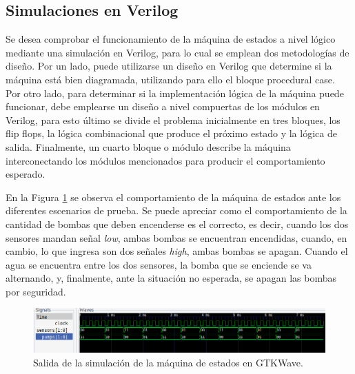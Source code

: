 \subsection{Simulaciones en Verilog}
Se desea comprobar el funcionamiento de la máquina de estados a nivel l\'ogico mediante una simulaci\'on en Verilog, para lo cual se emplean
dos metodolog\'ias de dise\~no.
Por un lado, puede utilizarse un dise\~no en Verilog que determine si la m\'aquina est\'a bien diagramada, utilizando para ello el bloque procedural case.
Por otro lado, para determinar si la implementaci\'on l\'ogica de la m\'aquina puede funcionar, debe emplearse un dise\~no a nivel compuertas de los m\'odulos en Verilog,
para esto \'ultimo se divide el problema inicialmente en tres bloques, los flip flops, la l\'ogica combinacional que produce el pr\'oximo estado y la l\'ogica de salida.
Finalmente, un cuarto bloque o m\'odulo describe la m\'aquina interconectando los m\'odulos mencionados para producir el comportamiento esperado.

En la Figura \ref{fig:gtkwave_sim_ex5} se observa el comportamiento de la máquina de estados ante los diferentes escenarios de prueba.
Se puede apreciar como el comportamiento de la cantidad de bombas que deben encenderse es el correcto, es decir, cuando los dos sensores mandan señal \textit{low}, ambas 
bombas se encuentran encendidas, cuando, en cambio, lo que ingresa son dos señales \textit{high}, ambas bombas se apagan.
Cuando el agua se encuentra entre los dos sensores, la bomba que se enciende se va alternando, y, finalmente, ante la situación no esperada, se apagan las bombas por seguridad.
\begin{figure}[H]
    \centering
    \includegraphics[width=\textwidth]{../EJ1/Recursos/gtkwave_sim.png}
    \caption{Salida de la simulación de la máquina de estados en GTKWave.}
    \label{fig:gtkwave_sim_ex5}
\end{figure}

